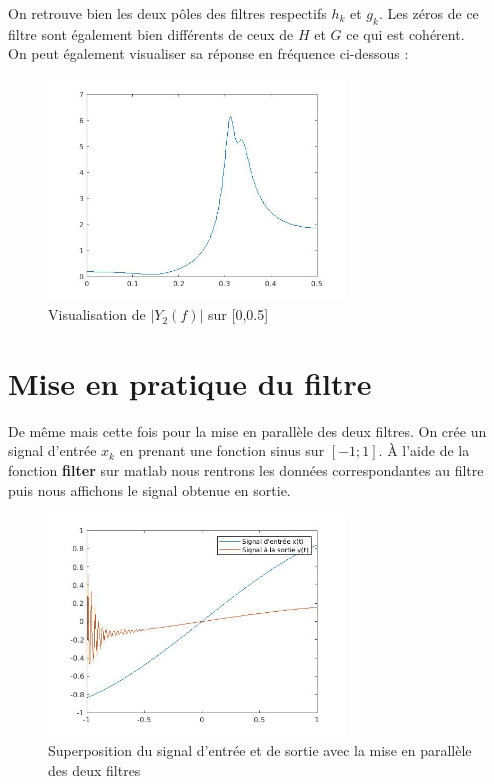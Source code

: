 \documentclass[12,french]{report}
\begin{document}
On retrouve bien les deux pôles des filtres respectifs $h_k$ et $g_k$. Les zéros de ce filtre sont également bien différents de ceux de $H$ et $G$ ce qui est cohérent.\\

On peut également visualiser sa réponse en fréquence ci-dessous :

\begin{figure}[H]
	\center
	\includegraphics[width=0.7\textwidth]{./Images/freqz_Y2}
	\caption{Visualisation de $|Y_2(f)|$ sur [0,0.5]}
\end{figure}\vspace{0.2cm}


\section{Mise en pratique du filtre}

De même mais cette fois pour la mise en parallèle des deux filtres. On crée un signal d'entrée $x_k$ en prenant une fonction sinus sur $[-1;1]$.
À l'aide de la fonction \textbf{filter} sur matlab nous rentrons les données correspondantes au filtre puis nous affichons le signal obtenue en sortie.

\begin{figure}[H]
	\center
	\includegraphics[width=0.7\textwidth]{./Images/filterparallele}
	\caption{Superposition du signal d'entrée et de sortie avec la mise en parallèle des deux filtres}
\end{figure}\vspace{0.2cm}
\end{document}
